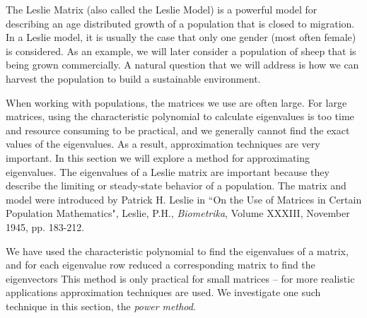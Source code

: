  \label{sec:approx_eigenvalues}

\vspace*{-17 pt}

\vspace*{13 pt}


The Leslie Matrix (also called the Leslie Model) is a powerful model for describing an age distributed growth of a population that is closed to migration. In a Leslie model, it is usually the case that only one gender (most often female) is considered. As an example, we will later consider a population of sheep that is being grown commercially. A natural question that we will address is how we can harvest the population to build a sustainable environment.

When working with populations, the matrices we use are often large. For large matrices, using the characteristic polynomial to calculate eigenvalues is too time and resource consuming to be practical, and we generally cannot find the exact values of the eigenvalues. As a result, approximation techniques are very important. In this section we will explore a method for approximating eigenvalues. The eigenvalues of a Leslie matrix are important because they describe the limiting or steady-state behavior of a population. The matrix and model were introduced by Patrick H. Leslie in ``On the Use of Matrices in Certain Population Mathematics", Leslie, P.H., \emph{Biometrika}, Volume XXXIII, November 1945, pp. 183-212.



We have used the characteristic polynomial to find the eigenvalues of a matrix, and for each eigenvalue row reduced a corresponding matrix to find the eigenvectors This method is only practical for small matrices -- for more realistic applications approximation techniques are used. We investigate one such technique in this section, the \emph{power method}. 


